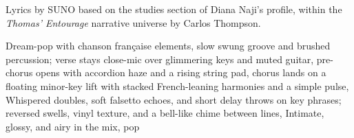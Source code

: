 
\begin{notes}
Lyrics by SUNO based on the studies section of Diana Naji's profile, within the \emph{Thomas’ Entourage} narrative universe by Carlos Thompson.
\end{notes}
\begin{style}
Dream-pop with chanson française elements, slow swung groove and brushed percussion; verse stays close-mic over glimmering keys and muted guitar, pre-chorus opens with accordion haze and a rising string pad, chorus lands on a floating minor-key lift with stacked French-leaning harmonies and a simple pulse, Whispered doubles, soft falsetto echoes, and short delay throws on key phrases; reversed swells, vinyl texture, and a bell-like chime between lines, Intimate, glossy, and airy in the mix, pop
\end{style}
